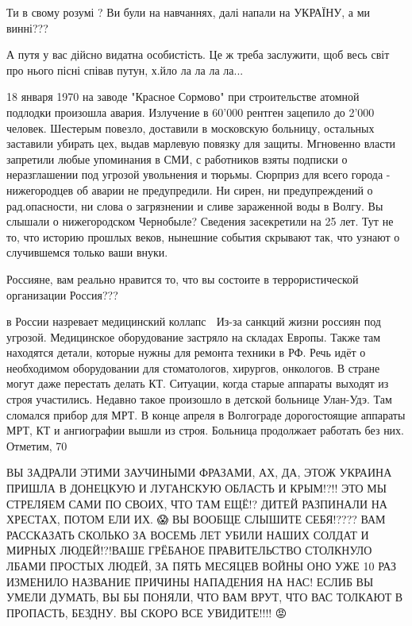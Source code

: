 Ти в свому розумі ? Ви були на навчаннях, далі напали на УКРАЇНУ, а ми винні???

А путя у вас дійсно видатна особистість. Це ж треба заслужити, щоб весь світ
про нього пісні співав путун, х.йло ла ла ла ла...

18 января 1970 на заводе "Красное Сормово" при строительстве атомной подлодки произошла авария. Излучение в 60’000 рентген зацепило до 2’000 человек. Шестерым повезло, доставили в московскую больницу, остальных заставили убирать цех, выдав марлевую повязку для защиты.
Мгновенно власти запретили любые упоминания в СМИ, с работников взяты подписки о неразглашении под угрозой увольнения и тюрьмы. Сюрприз для всего города - нижегородцев об аварии не предупредили. Ни сирен, ни предупреждений о рад.опасности, ни слова о загрязнении и сливе зараженной воды в Волгу.
Вы слышали о нижегородском Чернобыле? Сведения засекретили на 25 лет. Тут не то, что историю прошлых веков, нынешние события скрывают так, что узнают о случившемся только ваши внуки.

Россияне, вам реально нравится то, что вы состоите в террористической
организации Россия???

в России назревает медицинский коллапс 🤯
Из-за санкций жизни россиян под угрозой. Медицинское оборудование застряло на складах Европы. Также там находятся детали, которые нужны для ремонта техники в РФ.
Речь идёт о необходимом оборудовании для стоматологов, хирургов, онкологов. В стране могут даже перестать делать КТ. Ситуации, когда старые аппараты выходят из строя участились. Недавно такое произошло в детской больнице Улан-Удэ. Там сломался прибор для МРТ. В конце апреля в Волгограде дорогостоящие аппараты МРТ, КТ и ангиографии вышли из строя. Больница продолжает работать без них.
Отметим, 70 %

ВЫ ЗАДРАЛИ ЭТИМИ ЗАУЧИНЫМИ ФРАЗАМИ, АХ, ДА, ЭТОЖ  УКРАИНА ПРИШЛА В ДОНЕЦКУЮ И ЛУГАНСКУЮ ОБЛАСТЬ И КРЫМ!?!! ЭТО МЫ СТРЕЛЯЕМ САМИ ПО СВОИХ, ЧТО ТАМ ЕЩЁ!? ДИТЕЙ РАЗПИНАЛИ НА ХРЕСТАХ, ПОТОМ ЕЛИ ИХ. 😱
ВЫ ВООБЩЕ СЛЫШИТЕ СЕБЯ!???? 
ВАМ РАССКАЗАТЬ СКОЛЬКО ЗА ВОСЕМЬ ЛЕТ УБИЛИ НАШИХ СОЛДАТ И МИРНЫХ ЛЮДЕЙ!?!ВАШЕ ГРЁБАНОЕ ПРАВИТЕЛЬСТВО СТОЛКНУЛО ЛБАМИ ПРОСТЫХ ЛЮДЕЙ, ЗА ПЯТЬ МЕСЯЦЕВ ВОЙНЫ ОНО УЖЕ 10 РАЗ ИЗМЕНИЛО НАЗВАНИЕ ПРИЧИНЫ НАПАДЕНИЯ НА НАС! 
ЕСЛИБ ВЫ УМЕЛИ ДУМАТЬ, ВЫ БЫ ПОНЯЛИ, ЧТО ВАМ ВРУТ, ЧТО ВАС ТОЛКАЮТ В ПРОПАСТЬ, БЕЗДНУ. 
ВЫ СКОРО ВСЕ УВИДИТЕ!!!! 😡

